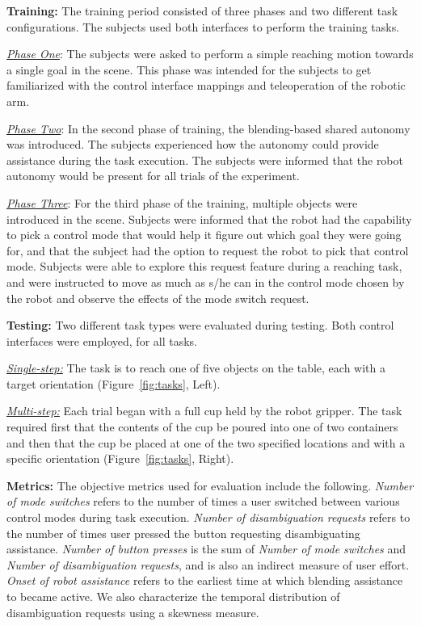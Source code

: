 \documentclass[natbib, twocolumn]{svjour3}          %
\begin{document}
\noindent\textbf{Training:} The training period consisted of three phases and two different task configurations. The subjects used both interfaces to perform the training tasks.

\noindent\underline{\textit{Phase One}}: The subjects were asked to perform a simple reaching motion towards a single goal in the scene. This phase was intended for the subjects to get familiarized with the control interface mappings and teleoperation of the robotic arm. 

\noindent\underline{\textit{Phase Two}}: In the second phase of training, the blending-based shared autonomy was introduced. The subjects experienced how the autonomy could provide assistance during the task execution. The subjects were informed that the robot autonomy would be present for all trials of the experiment. 

\noindent\underline{\textit{Phase Three}}: For the third phase of the training, multiple objects were introduced in the scene. 
Subjects were informed that the robot had the capability to pick a control mode that would help it figure out which goal they were going for, and that the subject had the option to request the robot to pick that control mode. 
Subjects were able to explore this request feature during a reaching task, and were instructed to move as much as s/he can in the control mode chosen by the robot and observe the effects of the mode switch request. 

\noindent\textbf{Testing:} Two different task types were evaluated during testing. Both control interfaces were employed, for all tasks.

\noindent\underline{\textit{Single-step:}} The task is to reach one of five objects on the table, each with a target orientation (Figure~\ref{fig:tasks}, Left). 

\noindent\underline{\textit{Multi-step:}} Each trial began with a full cup held by the robot gripper. The task required first that the contents of the cup be poured into one of two containers and then that the cup be placed at one of the two specified locations and with a specific orientation (Figure~\ref{fig:tasks}, Right). 


\noindent\textbf{Metrics:}
The objective metrics used for evaluation include the following. \textit{Number of mode switches} refers to the number of times a user switched between various control modes during task execution. \textit{Number of disambiguation requests} refers to the number of times user pressed the button requesting disambiguating assistance. \textit{Number of button presses} is the sum of \textit{Number of mode switches} and \textit{Number of disambiguation requests}, and is also an indirect measure of user effort. \textit{Onset of robot assistance} refers to the earliest time at which blending assistance to became active. We also characterize the temporal distribution of disambiguation requests using a skewness measure.
\end{document}
